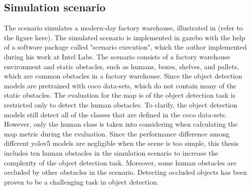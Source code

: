 \subsection{Simulation scenario}

The scenario simulates a modern-day factory warehouse, illustrated in (refer to the figure here). The simulated scenario is implemented in \gls{gazebo} with the help of a software package called "scenario execution", which the author implemented during his work at Intel Labs. The scenario consists of a factory warehouse environment and static obstacles, such as humans, boxes, shelves, and pallets, which are common obstacles in a factory warehouse. Since the object detection models are pretrained with \gls{coco} data-sets, which do not contain many of the static obstacles. The evaluation for the \gls{map} is of the object detection task is restricted only to detect the human obstacles. To clarify, the object detection models still detect all of the classes that are defined in the \gls{coco} data-sets. However, only the human class is taken into considering when calculating the \gls{map} metric during the evaluation. Since the performance difference among different \gls{yolov5} models are negligible when the scene is too simple, this thesis includes ten human obstacles in the simulation scenario to increase the complexity of the object detection task. Moreover, some human obstacles are occluded by other obstacles in the scenario. Detecting occluded objects has been proven to be a challenging task in object detection. 


